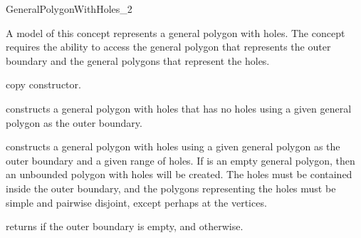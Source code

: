 \ccRefPageBegin
 
\def\ccLongParamLayout{\ccFalse}
\begin{ccRefConcept}{GeneralPolygonWithHoles_2}


\ccRefines

\ccTypes
\ccThreeToTwo




\ccDefinition
A model of this concept represents a general polygon with holes. The
concept requires the ability to access the general polygon that
represents the outer boundary and the general polygons that represent
the holes.

\ccThreeToTwo

\ccCreation
{}

\ccGlue
{}
{copy constructor.}
\ccGlue
{}

{constructs a general polygon with holes that has no holes using a given general polygon  as the outer boundary.}

{constructs a general polygon with holes using a given general polygon
 as the outer boundary and a given range of holes. If 
is an empty general polygon, then an unbounded polygon with holes will be
created. The holes must be contained inside the outer boundary, and the
polygons representing the holes must be simple and pairwise disjoint, except
perhaps at the vertices.}

\ccPredicates
{returns  if the outer boundary is empty, and 
otherwise.}


\end{ccRefConcept}
